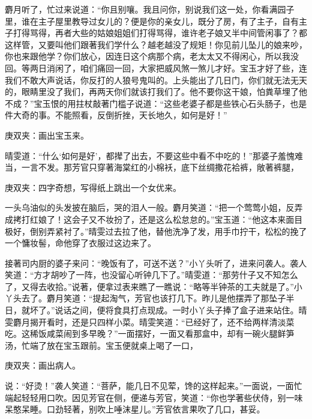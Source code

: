 \begin{parag}
麝月听了，忙过来说道：“你且别嚷。我且问你，别说我们这一处，你看满园子里，谁在主子屋里教导过女儿的？便是你的亲女儿，既分了房，有了主子，自有主子打得骂得，再者大些的姑娘姐姐们打得骂得，谁许老子娘又半中间管闲事了？都这样管，又要叫他们跟著我们学什么？越老越没了规矩！你见前儿坠儿的娘来吵，你也来跟他学？你们放心，因连日这个病那个病，老太太又不得闲心，所以我没回。等两日消闲了，咱们痛回一回，大家把威风煞一煞儿才好。宝玉才好了些，连我们不敢大声说话，你反打的人狼号鬼叫的。上头能出了几日门，你们就无法无天的，眼睛里没了我们，再两天你们就该打我们了。他不要你这干娘，怕粪草埋了他不成？”宝玉恨的用拄杖敲著门槛子说道：“这些老婆子都是些铁心石头肠子，也是件大奇的事。不能照看，反倒折挫，天长地久，如何是好！”\begin{note}庚双夹：画出宝玉来。\end{note}晴雯道：“什么‘如何是好’，都撵了出去，不要这些中看不中吃的！”那婆子羞愧难当，一言不发。那芳官只穿著海棠红的小棉袄，底下丝绸撒花袷裤，敞著裤腿，\begin{note}庚双夹：四字奇想，写得纸上跳出一个女优来。\end{note}一头乌油似的头发披在脑后，哭的泪人一般。麝月笑道：“把一个莺莺小姐，反弄成拷打红娘了！这会子又不妆扮了，还是这么松怠怠的。”宝玉道：“他这本来面目极好，倒别弄紧衬了。”晴雯过去拉了他，替他洗净了发，用手巾拧干，松松的挽了一个慵妆髻，命他穿了衣服过这边来了。
\end{parag}


\begin{parag}
    接著司内厨的婆子来问：“晚饭有了，可送不送？”小丫头听了，进来问袭人。袭人笑道：“方才胡吵了一阵，也没留心听钟几下了。”晴雯道：“那劳什子又不知怎么了，又得去收拾。”说著，便拿过表来瞧了一瞧说：“略等半钟茶的工夫就是了。”小丫头去了。麝月笑道：“提起淘气，芳官也该打几下。昨儿是他摆弄了那坠子半日，就坏了。”说话之间，便将食具打点现成。一时小丫头子捧了盒子进来站住。晴雯麝月揭开看时，还是只四样小菜。晴雯笑道：“已经好了，还不给两样清淡菜吃。这稀饭咸菜闹到多早晚？”一面摆好，一面又看那盒中，却有一碗火腿鲜笋汤，忙端了放在宝玉跟前。宝玉便就桌上喝了一口，\begin{note}庚双夹：画出病人。\end{note}说：“好烫！”袭人笑道：“菩萨，能几日不见荤，馋的这样起来。”一面说，一面忙端起轻轻用口吹。因见芳官在侧，便递与芳官，笑道：“你也学著些伏侍，别一味呆憨呆睡。口劲轻著，别吹上唾沫星儿。”芳官依言果吹了几口，甚妥。
\end{parag}


